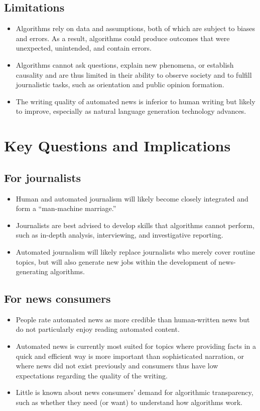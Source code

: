 \documentclass[notoc, symmetric, nobib, nols]{towcenter-guideto-book}
\begin{document}
\subsection{Limitations}
\begin{itemize}
\item Algorithms rely on data and assumptions, both of which are subject to biases and errors. As a result, algorithms could produce outcomes that were unexpected, unintended, and contain errors. 
\item Algorithms cannot ask questions, explain new phenomena, or establish causality and are thus limited in their ability to observe society and to fulfill journalistic tasks, such as orientation and public opinion formation. 
\item The writing quality of automated news is inferior to human writing but likely to improve, especially as natural language generation technology advances.
\end{itemize}

\section{Key Questions and Implications}

\subsection{For journalists}
\begin{itemize}
\item Human and automated journalism will likely become closely integrated and form a “man-machine marriage.” 
\item Journalists are best advised to develop skills that algorithms cannot perform, such as in-depth analysis, interviewing, and investigative reporting. 
\item Automated journalism will likely replace journalists who merely cover routine topics, but will also generate new jobs within the development of news-generating algorithms. 
\end{itemize}

\subsection{For news consumers}
\begin{itemize}
\item People rate automated news as more credible than human-written news but do not particularly enjoy reading automated content.
\item Automated news is currently most suited for topics where providing facts in a quick and efficient way is more important than sophisticated narration, or where news did not exist previously and consumers thus have low expectations regarding the quality of the writing. 
\item Little is known about news consumers' demand for algorithmic transparency, such as whether they need (or want) to understand how algorithms work. 
\end{itemize}
\end{document}
